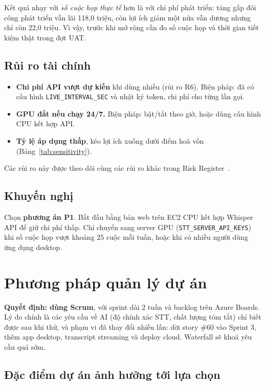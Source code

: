 \documentclass[12pt,a4paper]{report}
\begin{document}
Kết quả nhạy với \emph{số cuộc họp thực tế} hơn là với chi phí phát triển: tăng gấp đôi công phát triển vẫn lãi
118,0 triệu, còn lợi ích giảm một nửa vẫn dương nhưng chỉ còn 22,0 triệu. Vì vậy, trước khi mở rộng cần đo số
cuộc họp và thời gian tiết kiệm thật trong đợt UAT.

\section{Rủi ro tài chính}

\begin{itemize}
  \item \textbf{Chi phí API vượt dự kiến} khi dùng nhiều (rủi ro R6). Biện pháp: đã có cấu hình
        \texttt{LIVE\_INTERVAL\_SEC} và nhật ký token, chi phí cho từng lần gọi.
  \item \textbf{GPU đắt nếu chạy 24/7.} Biện pháp: bật/tắt theo giờ, hoặc dùng cấu hình CPU kết hợp API.
  \item \textbf{Tỷ lệ áp dụng thấp}, kéo lợi ích xuống dưới điểm hoà vốn (Bảng~\ref{tab:sensitivity}).
\end{itemize}
Các rủi ro này được theo dõi cùng các rủi ro khác trong Risk Register~\cite{pmp}.

\section{Khuyến nghị}

Chọn \textbf{phương án P1}. Bắt đầu bằng bản web trên EC2 CPU kết hợp Whisper API để giữ chi phí thấp. Chỉ chuyển
sang server GPU (\texttt{STT\_SERVER\_API\_KEYS}) khi số cuộc họp vượt khoảng 25 cuộc mỗi tuần, hoặc khi có
nhiều người dùng ứng dụng desktop.

\chapter{Phương pháp quản lý dự án}
\label{chap:method}

\textbf{Quyết định: dùng Scrum}, với sprint dài 2 tuần và backlog trên Azure Boards. Lý do chính là
các yêu cầu về AI (độ chính xác STT, chất lượng tóm tắt) chỉ biết được sau khi thử, và phạm vi đã thay đổi nhiều
lần: dời story \#60 vào Sprint 3, thêm app desktop, transcript streaming và deploy cloud. Waterfall sẽ khoá yêu
cầu quá sớm.

\section{Đặc điểm dự án ảnh hưởng tới lựa chọn}
\end{document}
